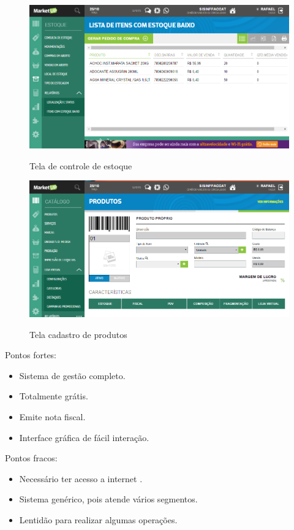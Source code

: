 \begin{figure}[H]
\centering
\caption{Tela de controle de estoque}
\includegraphics[width=15cm]{imagens/estoque-MarktUP.png}
\label{fig:ControleEstoqueMarketUP}
\end{figure}

\begin{figure}[H]
\centering
\caption{Tela cadastro de produtos}
\includegraphics[width=16cm]{imagens/CadProdMark.png}
\label{fig:CadastroProdutoMarketUP}
\end{figure}


Pontos fortes: 
\begin{itemize}
            \item Sistema de gestão completo.
            \item Totalmente grátis.
            \item Emite nota fiscal.
            \item Interface gráfica de fácil interação.
 \end{itemize}
                
Pontos fracos: 
\begin{itemize}
    \item Necessário ter acesso a internet .
    \item Sistema genérico, pois atende vários segmentos.
    \item Lentidão para realizar algumas operações.
\end{itemize}
            
